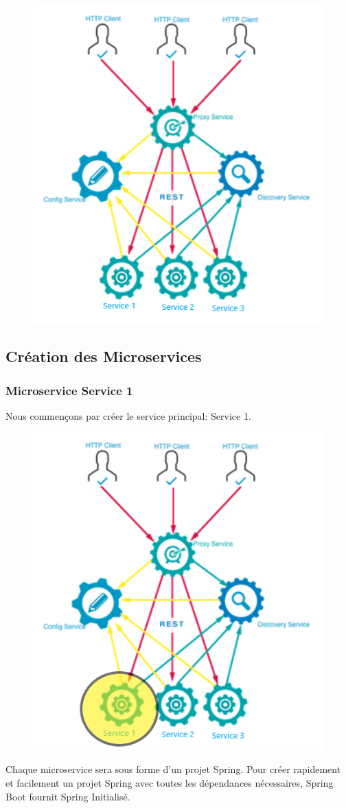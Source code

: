 \begin{figure}[H]
	\centering
	\includegraphics[width=0.5\linewidth]{images/tp01}
	\caption{}
	\label{fig:tp01}
\end{figure}


\subsection{Création des Microservices}
\subsubsection{Microservice  Service 1}
Nous commençons par créer le service principal: Service 1.

\begin{figure}[H]
	\centering
	\includegraphics[width=0.5\linewidth]{images/tp02}
	\caption{}
	\label{fig:tp02}
\end{figure}


Chaque microservice sera sous forme d'un projet Spring. Pour créer rapidement et facilement un projet Spring avec toutes les dépendances nécessaires, Spring Boot fournit Spring Initialisé.

